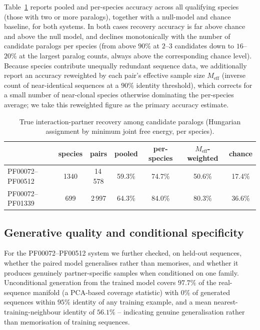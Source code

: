 \documentclass[11pt]{article}
\begin{document}
Table~\ref{tab:pairing} reports pooled and per-species accuracy across all
qualifying species (those with two or more paralogs), together with a
null-model and chance baseline, for both systems. In both cases recovery
accuracy is far above chance and above the null model, and declines
monotonically with the number of candidate paralogs per species (from
above $90\%$ at $2$--$3$ candidates down to $16$--$20\%$ at the largest
paralog counts, always above the corresponding chance level). Because
species contribute unequally redundant sequence data, we additionally
report an accuracy reweighted by each pair's effective sample size
$M_{\mathrm{eff}}$ (inverse count of near-identical sequences at a $90\%$
identity threshold), which corrects for a small number of near-clonal
species otherwise dominating the per-species average; we take this
reweighted figure as the primary accuracy estimate.

\begin{table}[htb]
\centering
\caption{True interaction-partner recovery among candidate paralogs
(Hungarian assignment by minimum joint free energy, per species).}
\label{tab:pairing}
\begin{tabular}{lcccccc}
\toprule
 & species & pairs & pooled & per-species & $M_{\mathrm{eff}}$-weighted & chance \\
\midrule
PF00072--PF00512 & 1340 & 14\,578 & 59.3\% & 74.7\% & 50.6\% & 17.4\% \\
PF00072--PF01339 & 699 & 2\,997 & 64.3\% & 84.0\% & 80.3\% & 36.6\% \\
\bottomrule
\end{tabular}
\end{table}

\subsection{Generative quality and conditional specificity}
\label{sec:generalization}

For the PF00072--PF00512 system we further checked, on held-out sequences,
whether the paired model generalises rather than memorises, and whether it
produces genuinely partner-specific samples when conditioned on one
family. Unconditional generation from the trained model covers $97.7\%$
of the real-sequence manifold (a PCA-based coverage statistic) with $0\%$
of generated sequences within $95\%$ identity of any training example, and
a mean nearest-training-neighbour identity of $56.1\%$ -- indicating
genuine generalisation rather than memorisation of training sequences.
\end{document}

